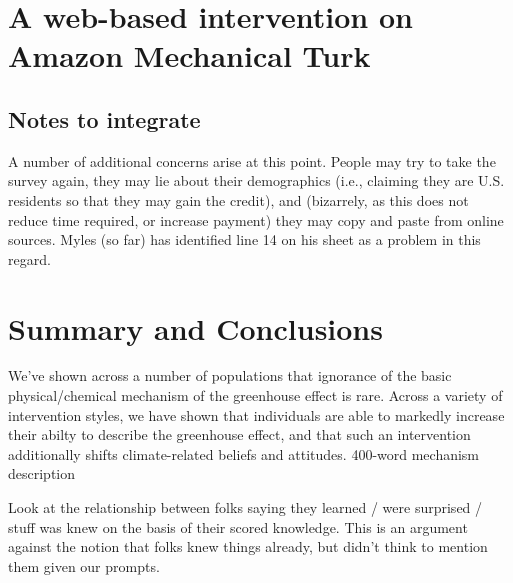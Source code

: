 
\section{A web-based intervention on Amazon Mechanical Turk}

\subsection{Notes to integrate}

A number of additional concerns arise at this point. People may try to take the
survey again, they may lie about their demographics (i.e., claiming they are
U.S. residents so that they may gain the credit), and (bizarrely, as this does
not reduce time required, or increase payment) they may copy and paste from
online sources. Myles (so far) has identified line 14 on his sheet as a problem
in this regard.

\section{Summary and Conclusions}

We've shown across a number of populations that ignorance of the basic
physical/chemical mechanism of the greenhouse effect is rare. Across a variety
of intervention styles, we have shown that individuals are able to markedly
increase their abilty to describe the greenhouse effect, and that such an
intervention additionally shifts climate-related beliefs and attitudes.
400-word mechanism description


Look at the relationship between folks saying they learned / were surprised /
stuff was knew on the basis of their scored knowledge. This is an argument
against the notion that folks knew things already, but didn’t think to mention
them given our prompts.
